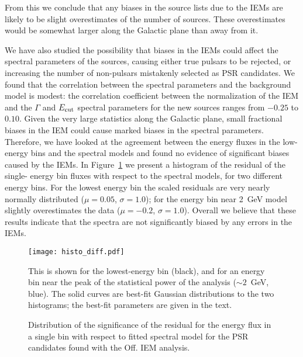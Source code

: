 \documentclass[iop]{emulateapj}
\begin{document}
From this we conclude that any biases in the source lists due
  to the IEMs are likely to be slight overestimates of the number of
  sources.  These overestimates would be somewhat larger along the
  Galactic plane than away from it.

We have also studied the possibility that biases in the IEMs
  could affect the spectral parameters of the sources, causing either
  true pulsars to be rejected, or increasing the number of non-pulsars
  mistakenly selected as PSR candidates.  We found that the
  correlation between the spectral parameters and the background model
  is modest: the correlation coefficient between the normalization of
  the IEM and the $\Gamma$ and $E_{\rm cut}$ spectral parameters for
  the new sources ranges from $-0.25$ to $0.10$.  Given the very large
  statistics along the Galactic plane, small fractional biases in the
  IEM could cause marked biases in the spectral parameters.
  Therefore, we have looked at the agreement between the energy fluxes
  in the low-energy bins and the spectral models and found no evidence
  of significant biases caused by the IEMs.  In
  Figure~\ref{fig:signif_bin} we present a histogram of the residual
  of the single- energy bin fluxes with respect to the spectral
  models, for two different energy bins.  For the lowest energy bin
  the scaled residuals are very nearly normally distributed
  ($\mu = 0.05$, $\sigma = 1.0$); for the energy bin near 2~GeV model
  slightly overestimates the data ($\mu = -0.2$, $\sigma = 1.0$).
  Overall we believe that these results indicate that the spectra are
  not significantly biased by any errors in the IEMs.

\begin{figure}[!ht]
  \centering
\texttt{[image: histo\_diff.pdf]}
\caption{Distribution of the significance of the residual for the
  energy flux in a single bin with respect to fitted spectral model
for the PSR candidates found with the Off. IEM analysis.}
  This is shown for the lowest-energy bin (black), and for an energy bin
  near the peak of the statistical power of the analysis ($\sim
  2$~GeV, blue).  The solid curves are best-fit Gaussian distributions
  to the two histograms; the best-fit parameters are given in the text.
\label{fig:signif_bin} 
\end{figure}
\end{document}
